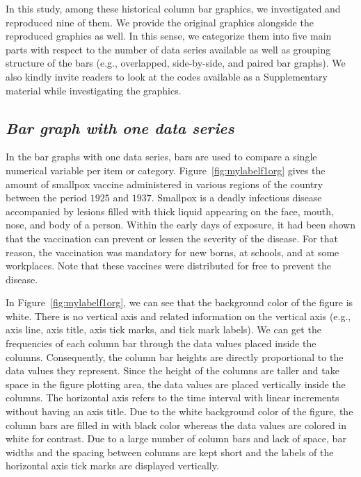 In this study, among these historical column bar graphics, we investigated and reproduced nine of them. We provide the original graphics alongside the reproduced graphics as well. In this sense, we categorize them into five main parts with respect to the number of data series available as well as grouping structure  of the bars (e.g., overlapped, side-by-side, and paired bar graphs). We also kindly invite readers to look at the  codes available as a Supplementary material while investigating the graphics.

\subsection{\textit{Bar graph with one data series}}

In the bar graphs with one data series, bars are used to compare a single numerical variable per item or category.  Figure~\ref{fig:mylabelf1org} gives the amount of smallpox vaccine administered in various regions of the country between the period $1925$ and $1937$. Smallpox is a deadly infectious disease accompanied by lesions filled with thick liquid appearing on the face, mouth, nose, and body of a person. Within the early days of exposure, it had been shown that the vaccination can prevent or lessen the severity of the disease. For that reason, the vaccination was mandatory for new borns, at schools, and at some workplaces. Note that these vaccines were distributed for free to prevent the disease.

In Figure~\ref{fig:mylabelf1org}, we can see that the background color of the figure is white. There is no vertical axis and related information on the vertical axis (e.g., axis line, axis title, axis tick marks, and tick mark labels). We can get the frequencies of each column bar through the data values placed inside the columns. Consequently, the column bar heights are directly proportional to the data values they represent. Since the height of the columns are taller and take space in the figure plotting area, the data values are placed vertically inside the columns. The horizontal axis refers to the time interval with linear increments without having an axis title.  Due to the white background color of the figure, the column bars are filled in with black color whereas the data values are colored in white for contrast. Due to a large number of column bars and lack of space, bar widths and the spacing between columns are kept short and the labels of the horizontal axis tick marks are displayed vertically. 


